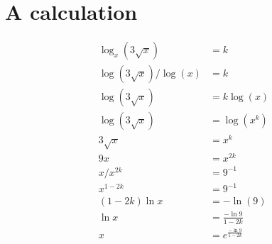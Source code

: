 \documentclass[12pt]{article}
\begin{document}
\newpage
\section*{A calculation}
\begin{align*}
\log_x(3 \sqrt x) &= k \\
\log (3 \sqrt x) / \log (x) &= k \\
\log (3 \sqrt x) &= k \log(x)\\
\log(3 \sqrt x) &= \log (x^k) \\
3 \sqrt x &= x^k \\
9x &= x^{2k} \\
x/x^{2k} &= 9^{-1} \\
x^{1-2k} &= 9^{-1} \\
(1 - 2k) \ln x &= - \ln (9) \\
\ln x &= \frac{-\ln 9}{1-2k} \\
x &= e^{\frac{- \ln 9}{1-2k}} \\
\end{align*}
\end{document}
